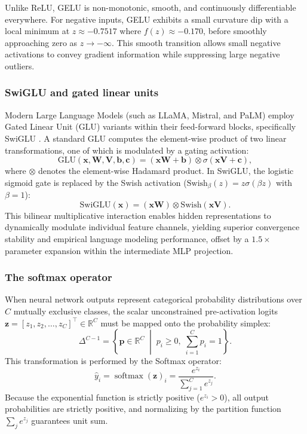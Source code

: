\documentclass[../../main.tex]{subfiles}
\begin{document}
Unlike ReLU, GELU is non-monotonic, smooth, and continuously differentiable everywhere. For negative inputs, GELU exhibits a small curvature dip with a local minimum at $z \approx -0.7517$ where $f(z) \approx -0.170$, before smoothly approaching zero as $z \to -\infty$. This smooth transition allows small negative activations to convey gradient information while suppressing large negative outliers.

\subsubsection{SwiGLU and gated linear units}

Modern Large Language Models (such as LLaMA, Mistral, and PaLM) employ Gated Linear Unit ($\text{GLU}$) variants within their feed-forward blocks, specifically SwiGLU \citep{shazeer2020glu}. A standard GLU computes the element-wise product of two linear transformations, one of which is modulated by a gating activation:
\begin{equation}
\text{GLU}(\mathbf{x}, \mathbf{W}, \mathbf{V}, \mathbf{b}, \mathbf{c}) = \left(\mathbf{x}\mathbf{W} + \mathbf{b}\right) \otimes \sigma\left(\mathbf{x}\mathbf{V} + \mathbf{c}\right),
\end{equation}
where $\otimes$ denotes the element-wise Hadamard product. In SwiGLU, the logistic sigmoid gate is replaced by the Swish activation ($\text{Swish}_\beta(z) = z \sigma(\beta z)$ with $\beta = 1$):
\begin{equation}
\text{SwiGLU}(\mathbf{x}) = \left( \mathbf{x}\mathbf{W} \right) \otimes \text{Swish}\left( \mathbf{x}\mathbf{V} \right).
\end{equation}
This bilinear multiplicative interaction enables hidden representations to dynamically modulate individual feature channels, yielding superior convergence stability and empirical language modeling performance, offset by a $1.5\times$ parameter expansion within the intermediate MLP projection.

\subsubsection{The softmax operator}

When neural network outputs represent categorical probability distributions over $C$ mutually exclusive classes, the scalar unconstrained pre-activation logits $\mathbf{z} = [z_1, z_2, \dots, z_C]^\top \in \mathbb{R}^C$ must be mapped onto the probability simplex:
\begin{equation}
\Delta^{C-1} = \left\{ \mathbf{p} \in \mathbb{R}^C \;\middle|\; p_i \ge 0, \; \sum_{i=1}^C p_i = 1 \right\}.
\end{equation}
This transformation is performed by the Softmax operator:
\begin{equation}
\hat{y}_i = \operatorname{softmax}(\mathbf{z})_i = \frac{e^{z_i}}{\sum_{j=1}^C e^{z_j}}.
\label{eq:softmax_definition}
\end{equation}
Because the exponential function is strictly positive ($e^{z_i} > 0$), all output probabilities are strictly positive, and normalizing by the partition function $\sum_j e^{z_j}$ guarantees unit sum.
\end{document}
